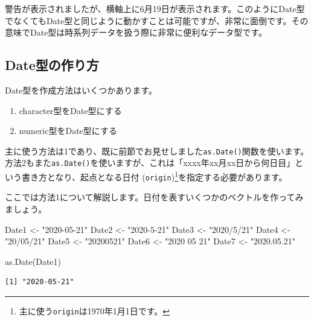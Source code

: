 \documentclass[
  a4paper,
  pandoc,
  ja=standard,
  jafont=haranoaji]{bxjsbook}
\newenvironment{Shaded}{\begin{snugshade}}{\end{snugshade}}
\newcommand{\FunctionTok}[1]{\textcolor[rgb]{0.28,0.35,0.67}{#1}}
\newcommand{\NormalTok}[1]{\textcolor[rgb]{0.00,0.48,0.65}{#1}}
\newcommand{\OtherTok}[1]{\textcolor[rgb]{0.00,0.48,0.65}{#1}}
\newcommand{\StringTok}[1]{\textcolor[rgb]{0.13,0.47,0.30}{#1}}
\providecommand{\tightlist}{%
  \setlength{\itemsep}{0pt}\setlength{\parskip}{0pt}}
\begin{document}
警告が表示されましたが、横軸上に6月19日が表示されます。このようにDate型でなくてもDate型と同じように動かすことは可能ですが、非常に面倒です。その意味でDate型は時系列データを扱う際に非常に便利なデータ型です。

\hypertarget{dateux578bux306eux4f5cux308aux65b9}{%
\subsection{Date型の作り方}\label{dateux578bux306eux4f5cux308aux65b9}}

Date型を作成方法はいくつかあります。

\begin{enumerate}
\def\labelenumi{\arabic{enumi}.}
\tightlist
\item
  character型をDate型にする
\item
  numeric型をDate型にする
\end{enumerate}

主に使う方法は1であり、既に前節でお見せしました\texttt{as.Date()}関数を使います。方法2もまた\texttt{as.Date()}を使いますが、これは「xxxx年xx月xx日から何日目」という書き方となり、起点となる日付
(\texttt{origin})\footnote{主に使う\texttt{origin}は1970年1月1日です。}を指定する必要があります。

ここでは方法1について解説します。日付を表すいくつかのベクトルを作ってみましょう。

\begin{Shaded}
\begin{Highlighting}[numbers=left,,]
\NormalTok{Date1 }\OtherTok{\textless{}{-}} \StringTok{"2020{-}05{-}21"}
\NormalTok{Date2 }\OtherTok{\textless{}{-}} \StringTok{"2020{-}5{-}21"}
\NormalTok{Date3 }\OtherTok{\textless{}{-}} \StringTok{"2020/5/21"}
\NormalTok{Date4 }\OtherTok{\textless{}{-}} \StringTok{"20/05/21"}
\NormalTok{Date5 }\OtherTok{\textless{}{-}} \StringTok{"20200521"}
\NormalTok{Date6 }\OtherTok{\textless{}{-}} \StringTok{"2020 05 21"}
\NormalTok{Date7 }\OtherTok{\textless{}{-}} \StringTok{"2020.05.21"}
\end{Highlighting}
\end{Shaded}

\begin{Shaded}
\begin{Highlighting}[numbers=left,,]
\FunctionTok{as.Date}\NormalTok{(Date1)}
\end{Highlighting}
\end{Shaded}

\begin{verbatim}
[1] "2020-05-21"
\end{verbatim}
\end{document}
